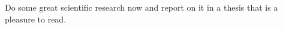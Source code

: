 \documentclass[german,version-2020-11]{uzl-thesis}
\begin{document}
Do some great scientific research now and report on it in a thesis
that is a pleasure to read. 


\listoftodos



%














% 
%
%
%
% 
% 
%
%
%
%
% 
% 
%
%
%
%
% 
%
%
\end{document}
